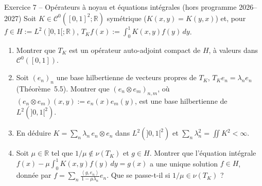 \documentclass[11pt,a4paper]{article}
\newcommand{\R}{\mathbb{R}}
\newcommand{\ps}[2]{\left\langle #1,#2\right\rangle}
\newcommand{\Cz}{\mathcal{C}^0}
\theoremstyle{definition}
\begin{document}
\begin{exo}{Exercice 7 -- Opérateurs à noyau et équations intégrales (hors programme 2026--2027)}
Soit $K\in\Cz([0,1]^2;\R)$ symétrique ($K(x,y)=K(y,x)$) et, pour $f\in H:=L^2(]0,1[;\R)$, $T_Kf(x):=\int_0^1K(x,y)f(y)\,dy$.
\begin{enumerate}[label=(\alph*)]
  \item Montrer que $T_K$ est un opérateur auto-adjoint compact de $H$, à valeurs dans $\Cz([0,1])$.
  \item Soit $(e_n)_n$ une base hilbertienne de vecteurs propres de $T_K$, $T_Ke_n=\lambda_ne_n$ (Théorème~5.5). Montrer que $(e_n\otimes e_m)_{n,m}$, où $(e_n\otimes e_m)(x,y):=e_n(x)e_m(y)$, est une base hilbertienne de $L^2(]0,1[^2)$.
  \item En déduire $K=\sum_n\lambda_n\,e_n\otimes e_n$ dans $L^2(]0,1[^2)$ et $\sum_n\lambda_n^2=\iint K^2<\infty$.
  \item Soit $\mu\in\R$ tel que $1/\mu\notin\nu(T_K)$ et $g\in H$. Montrer que l'équation intégrale $f(x)-\mu\int_0^1K(x,y)f(y)\,dy=g(x)$ a une unique solution $f\in H$, donnée par $f=\sum_n\frac{\ps g{e_n}}{1-\mu\lambda_n}e_n$. Que se passe-t-il si $1/\mu\in\nu(T_K)$ ?
\end{enumerate}
\end{exo}
\end{document}
